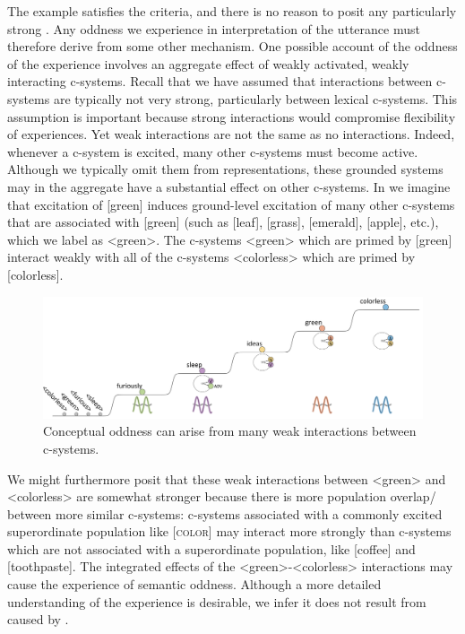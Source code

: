   The example satisfies the  criteria, and there is no reason to posit any particularly strong . Any oddness we experience in interpretation of the utterance must therefore derive from some other mechanism. One possible account of the oddness of the experience involves an aggregate effect of weakly activated, weakly interacting c-systems. Recall that we have assumed that interactions between c-systems are typically not very strong, particularly between lexical c-systems. This assumption is important because strong interactions would compromise flexibility of  experiences. Yet weak interactions are not the same as no interactions. Indeed, whenever a c-system is excited, many other c-systems must become active. Although we typically omit them from representations, these grounded systems may in the aggregate have a substantial effect on other c-systems. In {} we imagine that excitation of [green] induces ground-level excitation of many other c-systems that are associated with [green] (such as [leaf], [grass], [emerald], [apple], etc.), which we label as <green>. The c-systems <green> which are primed by [green] interact weakly with all of the c-systems <colorless> which are primed by [colorless]. 

  
\begin{figure}
\includegraphics[width=\textwidth]{figures/Tilsen-img134.png}
\caption{Conceptual oddness can arise from many weak interactions between c-systems.}
\label{fig:6:15}
\end{figure}
 

  We might furthermore posit that these weak interactions between <green> and <colorless> are somewhat stronger because there is more population overlap/ between more similar c-systems: c-systems associated with a commonly excited superordinate population like [\textsc{color}] may interact more strongly than c-systems which are not associated with a superordinate population, like [coffee] and [toothpaste]. The integrated effects of the <green>-<colorless> interactions may cause the experience of semantic oddness. Although a more detailed understanding of the experience is desirable, we infer it does not result from  caused by .

